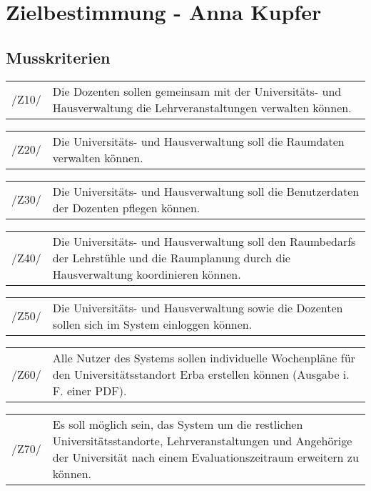 \section{Zielbestimmung - Anna Kupfer}
\label{sec:Zielbestimmung}

\subsection{Musskriterien}

\begin{tabular}{p{1.5cm}p{14.5cm}}	
	 /Z10/& Die Dozenten sollen gemeinsam mit der Universitäts- und Hausverwaltung die Lehrveranstaltungen verwalten können. \\[0.25cm]
\end{tabular}

\begin{tabular}{p{1.5cm}p{14.5cm}}	
	 /Z20/& Die Universitäts- und Hausverwaltung soll die Raumdaten verwalten können. \\[0.25cm]
\end{tabular}

\begin{tabular}{p{1.5cm}p{14.5cm}}	
	 /Z30/& Die Universitäts- und Hausverwaltung soll die Benutzerdaten der Dozenten pflegen können. \\[0.25cm]
\end{tabular}

\begin{tabular}{p{1.5cm}p{14.5cm}}	
	 /Z40/& Die Universitäts- und Hausverwaltung soll den Raumbedarfs der Lehrstühle und die Raumplanung durch die Hausverwaltung koordinieren können.  \\[0.25cm]
\end{tabular}

\begin{tabular}{p{1.5cm}p{14.5cm}}	
	 /Z50/& Die Universitäts- und Hausverwaltung sowie die Dozenten sollen sich im System einloggen können. \\[0.25cm]
\end{tabular}

\begin{tabular}{p{1.5cm}p{14.5cm}}	
	 /Z60/& Alle Nutzer des Systems sollen individuelle Wochenpläne für den Universitätsstandort Erba erstellen können (Ausgabe i. F. einer PDF). \\[0.25cm]
\end{tabular}

\begin{tabular}{p{1.5cm}p{14.5cm}}	
	 /Z70/& Es soll möglich sein,  das System um die restlichen Universitätsstandorte, Lehrveranstaltungen und Angehörige der Universität nach einem Evaluationszeitraum erweitern zu können. \\[0.25cm]
\end{tabular}

